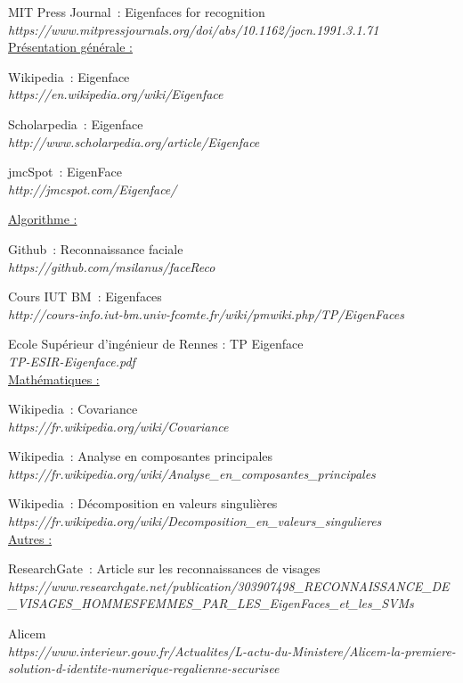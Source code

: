\documentclass[12pt,french]{article}
\theoremstyle{plain}
\theoremstyle{definition}
\begin{document}
\newpage
\begin{thebibliography}{18}
\bibitem{}
  MIT Press Journal~: Eigenfaces for recognition
  \\\textit{https://www.mitpressjournals.org/doi/abs/10.1162/jocn.1991.3.1.71}
  \\
  \underline{Présentation générale :}

\bibitem{}
  Wikipedia~: Eigenface
  \\\textit{https://en.wikipedia.org/wiki/Eigenface}

\bibitem{}
  Scholarpedia~: Eigenface
  \\\textit{http://www.scholarpedia.org/article/Eigenface}

\bibitem{}
  jmcSpot~: EigenFace
  \\\textit{http://jmcspot.com/Eigenface/}

  \underline{Algorithme :}

\bibitem{}
  Github~: Reconnaissance faciale
  \\\textit{https://github.com/msilanus/faceReco}

\bibitem{}
  Cours IUT BM~: Eigenfaces
  \\\textit{http://cours-info.iut-bm.univ-fcomte.fr/wiki/pmwiki.php/TP/EigenFaces}

\bibitem{}
  Ecole Supérieur d'ingénieur de Rennes : TP Eigenface
  \\\textit{TP-ESIR-Eigenface.pdf}
  \\
  \underline{Mathématiques :}

\bibitem{}
  Wikipedia~: Covariance
  \\\textit{https://fr.wikipedia.org/wiki/Covariance}

\bibitem{}
  Wikipedia~: Analyse en composantes principales
  \\\textit{https://fr.wikipedia.org/wiki/Analyse\_en\_composantes\_principales}

\bibitem{}
  Wikipedia~: Décomposition en valeurs singulières
  \\\textit{https://fr.wikipedia.org/wiki/Decomposition\_en\_valeurs\_singulieres}
  \\
  \underline{Autres :}

\bibitem{}
  ResearchGate~: Article sur les reconnaissances de visages
  \\\textit{https://www.researchgate.net/publication/303907498\_RECONNAISSANCE\_DE\_VISAGES\_HOMMESFEMMES\_PAR\_LES\_EigenFaces\_et\_les\_SVMs}

\bibitem{}
  Alicem
  \\\textit{https://www.interieur.gouv.fr/Actualites/L-actu-du-Ministere/Alicem-la-premiere-solution-d-identite-numerique-regalienne-securisee}


\end{thebibliography}
\end{document}
